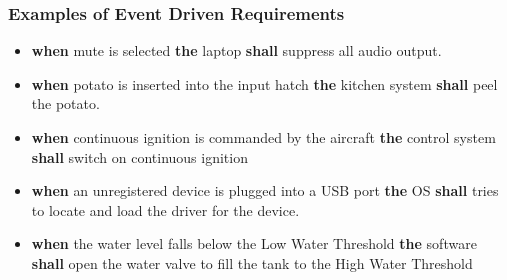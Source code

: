 \documentclass[aspectratio=169]{beamer}
\newcommand{\earse}[3]{{\bf \color{mygreen}when} {#1} {\bf \color{mypurple}the} {#2} {\bf \color{mypurple}shall} {#3}}
\begin{document}
%
\begin{frame}
  \frametitle{Examples of Event Driven Requirements}
   \begin{example}
   \begin{itemize}
     \item \earse{mute is selected}{laptop}{suppress all audio output}.
     \item \earse{potato is inserted into the input hatch}{kitchen system}{peel the potato}.
     \item \earse{continuous ignition is commanded by the aircraft}{control system}{switch on
continuous ignition}
     \item \earse{an unregistered device is plugged into a USB port}{OS}{tries to locate and load the driver for the device.}
     \item \earse{the water level falls below the Low Water Threshold}{software}{open the water valve
to fill the tank to the High Water Threshold}
   \end{itemize}
   \end{example}
\end{frame}
%
%
%
%
\end{document}
